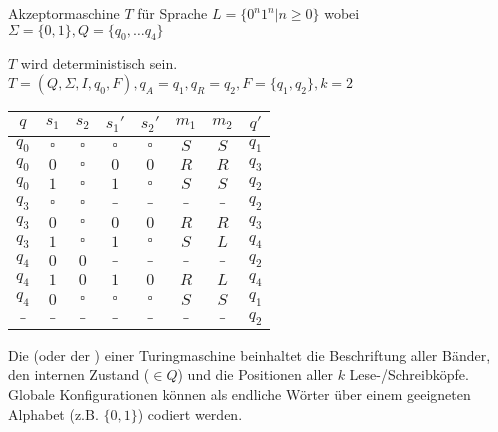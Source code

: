 \begin{beispiel}
    Akzeptormaschine $T$ für Sprache $L = \{ 0^n 1^n | n \geq 0 \}$ wobei $\Sigma= \{0,1\}, Q = \{q_0, \dots q_4 \}$

    $T$ wird deterministisch sein. $T = (Q, \Sigma, I, q_0, F), q_A = q_1, q_R = q_2, F = \{q_1, q_2\}, k=2$

    \vspace{2pt}
    \begin{tabular}{|c|c|c|c|c|c|c|c|}\hline
    \rowcolor{grau} $q$   & $s_1$     & $s_2$     & $s_1'$    & $s_2'$    & $m_1$ & $m_2$ & $q'$    \\\hline
                    $q_0$ & $\square$ & $\square$ & $\square$ & $\square$ & $S$   & $S$   & $q_1$   \\\hline
                    $q_0$ & $0$       & $\square$ & $0$       & $0$       & $R$   & $R$   & $q_3$   \\\hline
                    $q_0$ & $1$       & $\square$ & $1$       & $\square$ & $S$   & $S$   & $q_2$   \\\hline
                    $q_3$ & $\square$ & $\square$ & $\_$      & $\_$      & $\_$  & $\_$  & $q_2$   \\\hline
                    $q_3$ & $0$       & $\square$ & $0$       & $0$       & $R$   & $R$   & $q_3$   \\\hline
                    $q_3$ & $1$       & $\square$ & $1$       & $\square$ & $S$   & $L$   & $q_4$   \\\hline
                    $q_4$ & $0$       & $0$       & $\_$      & $\_$      & $\_$  & $\_$  & $q_2$   \\\hline
                    $q_4$ & $1$       & $0$       & $1$       & $0$       & $R$   & $L$   & $q_4$   \\\hline
                    $q_4$ & $0$       & $\square$ & $\square$ & $\square$ & $S$   & $S$   & $q_1$   \\\hline
                    $\_$  & $\_$      & $\_$      & $\_$      & $\_$      & $\_$  & $\_$  & $q_2$   \\\hline
    \end{tabular}

\end{beispiel}


Die  (oder der ) einer Turingmaschine beinhaltet die Beschriftung aller Bänder, den internen Zustand ($\in Q$) und die Positionen aller $k$ Lese-/Schreibköpfe. Globale Konfigurationen können als endliche Wörter über einem geeigneten Alphabet (z.B. $\{0,1\}$) codiert werden.


